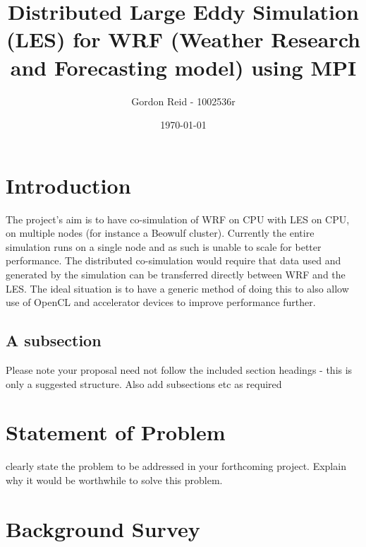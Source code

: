 \documentclass{mprop}
\begin{document}
\title{Distributed Large Eddy Simulation (LES) for WRF (Weather Research and
Forecasting model) using MPI}

\author{Gordon Reid - 1002536r}
\date{\today}
\maketitle

\tableofcontents
\newpage

\section{Introduction}\label{intro}

The project's aim is to have co-simulation of WRF on CPU with LES on CPU, on
multiple nodes (for instance a Beowulf cluster). Currently the entire simulation
runs on a single node and as such is unable to scale for better performance. The
distributed co-simulation would require that data used and generated by the
simulation can be transferred directly between WRF and the LES. The ideal
situation is to have a generic method of doing this to also allow use of OpenCL
and accelerator devices to improve performance further.

\subsection{A subsection}

Please note your proposal need not follow the included
section headings - this is only a suggested structure. Also add subsections etc
as required

\section{Statement of Problem}

clearly state the problem to be addressed in your forthcoming project. Explain
why it would be worthwhile to solve this problem.

\section{Background Survey}
\end{document}
